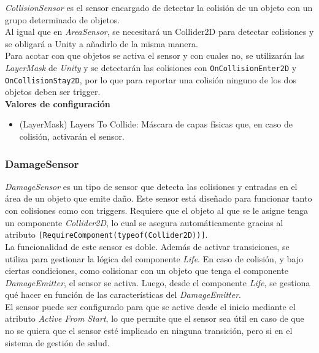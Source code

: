 \textit{CollisionSensor} es el sensor encargado de detectar la colisión de un objeto con un grupo determinado de objetos.\\

Al igual que en \textit{AreaSensor}, se necesitará un Collider2D para detectar colisiones y se obligará a Unity a añadirlo de la misma manera.\\

Para acotar con que objetos se activa el sensor y con cuales no, se utilizarán las \textit{LayerMask} de \textit{Unity} y se detectarán las colisiones con \texttt{OnCollisionEnter2D} y \texttt{OnCollisionStay2D}, por lo que para reportar una colisión ninguno de los dos objetos deben ser trigger.\\

\textbf{Valores de configuración}
\begin{itemize}
	\item (LayerMask) Layers To Collide: Máscara de capas físicas que, en caso de colisión, activarán el sensor.
\end{itemize}

\subsubsection{DamageSensor}

\textit{DamageSensor} es un tipo de sensor que detecta las colisiones y entradas en el área de un objeto que emite daño. Este sensor está diseñado para funcionar tanto con colisiones como con triggers. Requiere que el objeto al que se le asigne tenga un componente \textit{Collider2D}, lo cual se asegura automáticamente gracias al atributo \texttt{[RequireComponent(typeof(Collider2D))]}.\\

La funcionalidad de este sensor es doble. Además de activar transiciones, se utiliza para gestionar la lógica del componente \textit{Life}. En caso de colisión, y bajo ciertas condiciones, como colisionar con un objeto que tenga el componente \textit{DamageEmitter}, el sensor se activa. Luego, desde el componente \textit{Life}, se gestiona qué hacer en función de las características del \textit{DamageEmitter}.\\

El sensor puede ser configurado para que se active desde el inicio mediante el atributo \textit{Active From Start}, lo que permite que el sensor sea útil en caso de que no se quiera que el sensor esté implicado en ninguna transición, pero si en el sistema de gestión de salud.\\


